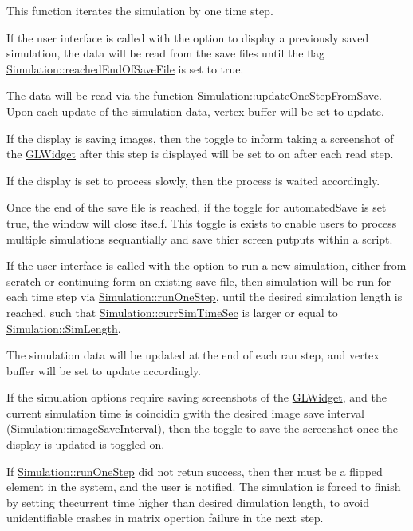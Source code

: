 This function iterates the simulation by one time step. 

If the user interface is called with the option to display a previously saved simulation, the data will be read from the save files until the flag \hyperlink{classSimulation_a99b66ca81fcc16dab7f44632ddff7ecd}{Simulation\+::reached\+End\+Of\+Save\+File} is set to true.

The data will be read via the function \hyperlink{classSimulation_a1f5dbbde572af555225089e247296e2e}{Simulation\+::update\+One\+Step\+From\+Save}. Upon each update of the simulation data, vertex buffer will be set to update.

If the display is saving images, then the toggle to inform taking a screenshot of the \hyperlink{classGLWidget}{G\+L\+Widget} after this step is displayed will be set to on after each read step.

If the display is set to process slowly, then the process is waited accordingly.

Once the end of the save file is reached, if the toggle for automated\+Save is set true, the window will close itself. This toggle is exists to enable users to process multiple simulations sequantially and save thier screen putputs within a script.~\newline


If the user interface is called with the option to run a new simulation, either from scratch or continuing form an existing save file, then simulation will be run for each time step via \hyperlink{classSimulation_a300713fd91c15b51421606bffd6d87b7}{Simulation\+::run\+One\+Step}, until the desired simulation length is reached, such that \hyperlink{classSimulation_a0a8d61383b2f51f2f98b72554b7e00cb}{Simulation\+::curr\+Sim\+Time\+Sec} is larger or equal to \hyperlink{classSimulation_a96bf105b28395184053bb4f987f05746}{Simulation\+::\+Sim\+Length}.

The simulation data will be updated at the end of each ran step, and vertex buffer will be set to update accordingly.

If the simulation options require saving screenshots of the \hyperlink{classGLWidget}{G\+L\+Widget}, and the current simulation time is coincidin gwith the desired image save interval (\hyperlink{classSimulation_acc8ebf021a21da302f6aabb24a9c5d87}{Simulation\+::image\+Save\+Interval}), then the toggle to save the screenshot once the display is updated is toggled on.

If \hyperlink{classSimulation_a300713fd91c15b51421606bffd6d87b7}{Simulation\+::run\+One\+Step} did not retun success, then ther must be a flipped element in the system, and the user is notified. The simulation is forced to finish by setting thecurrent time higher than desired dimulation length, to avoid unidentifiable crashes in matrix opertion failure in the next step.

